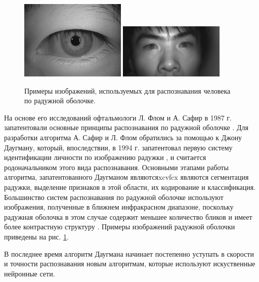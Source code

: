 \documentclass[14pt, a4paper]{extarticle}
\begin{document}
\begin{center}
\begin{figure}[h!]
	\centering
	\includegraphics[width=0.45\textwidth]{iris_sample_1.png}
	\hspace{0.05\textwidth}
	\includegraphics[width=0.45\textwidth]{iris_sample_2.png}
	\caption{Примеры изображений, используемых для распознавания человека по радужной оболочке.}
	\label{img:iris_samples}
\end{figure}
\vspace{-1cm}
\end{center}

На основе его исследований офтальмологи Л. Флом и А. Сафир в 1987 г. запатентовали основные принципы распознавания по радужной оболочке \cite{flom1987iris}. Для разработки алгоритма А. Сафир и Л. Флом обратились за помощью к Джону Даугману, который, впоследствии, в 1994 г. запатентовал первую систему идентификации личности по изображению радужки \cite{daugman1994biometric}, и считается родоначальником этого вида распознавания. Основными этапами работы алгоритма, запатентованного Даугманом являютсяxcvfcx   являются сегментация радужки, выделение признаков в этой области, их кодирование и классификация.
Большинство систем распознавания по радужной оболочке используют изображения, полученные в ближнем инфракрасном диапазоне, поскольку радужная оболочка в этом случае содержит меньшее количество бликов и имеет более контрастную структуру \cite{Daugman02}. Примеры изображений радужной оболочки приведены на рис. \ref{img:iris_samples}.

В последнее время алгоритм Даугмана начинает постепенно уступать в скорости и точности распознавания новым алгоритмам, которые используют искуственные нейронные сети.
\end{document}
